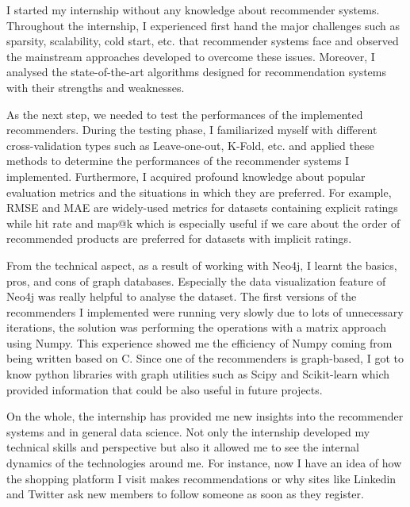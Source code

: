 I started my internship without any knowledge about recommender systems. Throughout the internship, I experienced first hand the major challenges such as sparsity, scalability, cold start, etc. that recommender systems face and observed the mainstream approaches developed to overcome these issues. Moreover, I analysed the state-of-the-art algorithms designed for recommendation systems with their strengths and weaknesses.

As the next step, we needed to test the performances of the implemented recommenders. During the testing phase, I familiarized myself with different cross-validation types such as Leave-one-out, K-Fold, etc. and applied these methods to determine the performances of the recommender systems I implemented. Furthermore, I acquired profound knowledge about popular evaluation metrics and the situations in which they are preferred. For example, RMSE and MAE are widely-used metrics for datasets containing explicit ratings while hit rate and map@k which is especially useful if we care about the order of recommended products are preferred for datasets with implicit ratings. 

From the technical aspect, as a result of working with Neo4j, I learnt the basics, pros, and cons of graph databases. Especially the data visualization feature of Neo4j was really helpful to analyse the dataset. The first versions of the recommenders I implemented were running very slowly due to lots of unnecessary iterations, the solution was performing the operations with a matrix approach using Numpy. This experience showed me the efficiency of Numpy coming from being written based on C. Since one of the recommenders is graph-based, I got to know python libraries with graph utilities such as Scipy and Scikit-learn which provided information that could be also useful in future projects.

On the whole, the internship has provided me new insights into the recommender systems and in general data science. Not only the internship developed my technical skills and perspective but also it allowed me to see the internal dynamics of the technologies around me.  For instance, now I have an idea of how the shopping platform I visit makes recommendations or why sites like Linkedin and Twitter ask new members to follow someone as soon as they register. \\